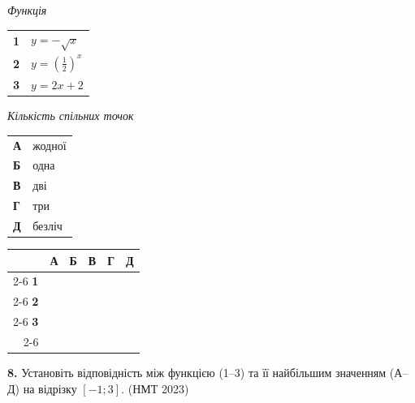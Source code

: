 \documentclass[14pt]{extarticle}
\newcommand{\answerGrid}{
    \begingroup
    \setlength{\tabcolsep}{4pt}
    \renewcommand{\arraystretch}{1.2}
    \small
    \begin{tabular}{r|c|c|c|c|c|}
         \multicolumn{1}{c}{} & \multicolumn{1}{c}{\textbf{А}} & \multicolumn{1}{c}{\textbf{Б}} & \multicolumn{1}{c}{\textbf{В}} & \multicolumn{1}{c}{\textbf{Г}} & \multicolumn{1}{c}{\textbf{Д}} \\ \cline{2-6}
         \textbf{1} & & & & & \\ \cline{2-6}
         \textbf{2} & & & & & \\ \cline{2-6}
         \textbf{3} & & & & & \\ \cline{2-6}
    \end{tabular}
    \endgroup
}
\newcommand{\nmtyear}[1]{\hfill{\small\color{yearcolor}(НМТ #1)}}
\begin{document}
\noindent
\begin{minipage}[t]{0.45\textwidth}
    \textit{Функція} \par \vspace{0.2cm}
    \begin{tabular}{@{}p{0.5cm} l@{}}
    \textbf{1} & $y = -\sqrt{x}$ \\[0.4cm]
    \textbf{2} & \colorbox{yellow!30}{$y = \left(\displaystyle\frac{1}{2}\right)^x$} \\[0.6cm]
    \textbf{3} & $y = 2x + 2$ \\
    \end{tabular}
\end{minipage}%
\hfill
\begin{minipage}[t]{0.50\textwidth}
    \textit{Кількість спільних точок} \par \vspace{0.2cm}
    \begin{tabular}{@{}p{0.5cm} p{7cm}@{}}
    \textbf{А} & жодної \\[0.2cm]
    \textbf{Б} & одна \\[0.2cm]
    \textbf{В} & дві \\[0.2cm]
    \textbf{Г} & три \\[0.2cm]
    \textbf{Д} & безліч \\
    \end{tabular}
\end{minipage}
\vspace{0.3cm}

\answerGrid
\vspace{0.7cm}

\noindent\textbf{8.} Установіть відповідність між функцією (1–3) та її найбільшим значенням (А–Д) на відрізку $[-1; 3]$. \nmtyear{2023}
\vspace{0.3cm}
\end{document}
